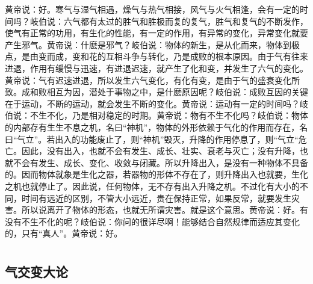\documentclass[a4paper,12pt,UTF8,twoside]{ctexbook}
\begin{document}
黄帝说：好。寒气与湿气相遇，燥气与热气相接，风气与火气相逢，会有一定的时间吗？岐伯说：六气都有太过的胜气和胜极而复的复气，胜气和复气的不断发作，使气有正常的功用，有生化的性能，有一定的作用，有异常的变化，异常变化就要产生邪气。黄帝说：什麽是邪气？岐伯说：物体的新生，是从化而来，物体到极点，是由变而成，变和花的互相斗争与转化，乃是成败的根本原因。由于气有往来进退，作用有缓慢与迅速，有进退迟速，就产生了化和变，并发生了六气的变化。黄帝说：气有迟速进退，所以发生六气变化，有化有变，是由于气的盛衰变化所致。成和败相互为因，潜处于事物之中，是什麽原因呢？岐伯说：成败互因的关键在于运动，不断的运动，就会发生不断的变化。黄帝说：运动有一定的时间吗？岐伯说：不生不化，乃是相对稳定的时期。黄帝说：物有不生不化吗？岐伯说：物体的内部存有生生不息之机，名曰“神机”，物体的外形依赖于气化的作用而存在，名曰“气立”。若出入的功能废止了，则“神机”毁灭，升降的作用停息了，则“气立“危亡。因此，没有出入，也就不会有发生、成长、壮实、衰老与灭亡；没有升降，也就不会有发生、成长、变化、收敛与闭藏。所以升降出入，是没有一种物体不具备的。因而物体就象是生化之器，若器物的形体不存在了，则升降出入也就要，生化之机也就停止了。因此说，任何物体，无不存有出入升降之机。不过化有大小的不同，时间有远近的区别，不管大小远近，贵在保持正常，如果反常，就要发生灾害。所以说离开了物体的形态，也就无所谓灾害。就是这个意思。黄帝说：好。有没有不生不化的呢？岐伯说：你问的很详尽啊！能够结合自然规律而适应其变化的，只有“真人”。黄帝说：好。

\part{}

\chapter{气交变大论}
\end{document}
